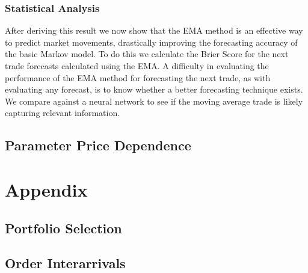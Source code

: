 \documentclass[a4paper,10pt]{article}
\begin{document}
\subsubsection{Statistical Analysis}
After deriving this result we now show that the EMA method is an effective way to predict market movements, drastically improving the forecasting accuracy of the basic Markov model. To do this we calculate the Brier Score for the next trade forecasts calculated using the EMA. A difficulty in evaluating the performance of the EMA method for forecasting the next trade, as with evaluating any forecast, is to know whether a better forecasting technique exists. We compare against a neural network to see if the moving average trade is likely capturing relevant information.
\subsection{Parameter Price Dependence}
\section{Appendix}
\subsection{Portfolio Selection}
\subsection{Order Interarrivals}
\medskip
\printbibliography
\end{document}
